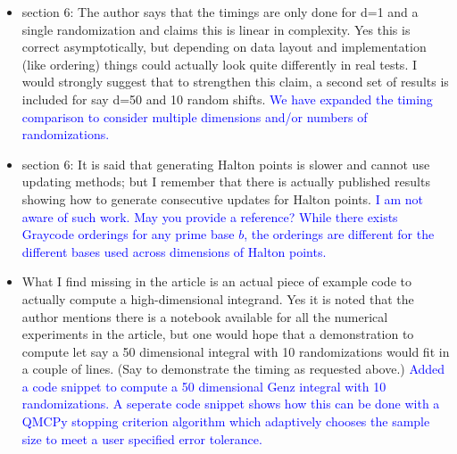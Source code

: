 \documentclass{article}
\newcommand{\response}[1]{{\newline \textcolor{blue}{#1}}}
\begin{document}
\begin{itemize}
    \response{I am not aware of such theory. May you provide a reference?} 
    \response{The following article consideres all $b!$ permutations of $\{0,1,\dots,b-1\}$.} 
    \response{Owen, Art B. ``Variance and discrepancy with alternative scramblings." ACM Transactions of Modeling and Computer Simulation 13.4 (2003).}
    \item section 6: The author says that the timings are only done for d=1 and a single randomization and claims this is linear in complexity. Yes this is correct asymptotically, but depending on data layout and implementation (like ordering) things could actually look quite differently in real tests. I would strongly suggest that to strengthen this claim, a second set of results is included for say d=50 and 10 random shifts.
    \response{We have expanded the timing comparison to consider multiple dimensions and/or numbers of randomizations.}
    \item section 6: It is said that generating Halton points is slower and cannot use updating methods; but I remember that there is actually published results showing how to generate consecutive updates for Halton points.
    \response{I am not aware of such work. May you provide a reference?}
    \response{While there exists Graycode orderings for any prime base $b$, the orderings are different for the different bases used across dimensions of Halton points.}
    \item What I find missing in the article is an actual piece of example code to actually compute a high-dimensional integrand. Yes it is noted that the author mentions there is a notebook available for all the numerical experiments in the article, but one would hope that a demonstration to compute let say a 50 dimensional integral with 10 randomizations would fit in a couple of lines. (Say to demonstrate the timing as requested above.)
    \response{Added a code snippet to compute a 50 dimensional Genz integral with 10 randomizations. A seperate code snippet shows how this can be done with a QMCPy stopping criterion algorithm which adaptively chooses the sample size to meet a user specified error tolerance.}
\end{itemize}
\end{document}
